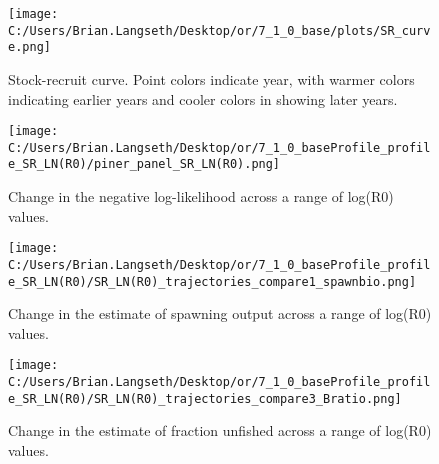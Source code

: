 \documentclass[11pt,
  english,
  a4paper,
]{article}
\begin{document}
\tagmcend\tagstructend


\begin{figure}
\centering
\texttt{[image: C:/Users/Brian.Langseth/Desktop/or/7\_1\_0\_base/plots/SR\_curve.png]}
\caption{Stock-recruit curve. Point colors indicate year, with warmer colors indicating earlier years and cooler colors in showing later years.\label{fig:bh-curve}}
\end{figure}

\tagmcend\tagstructend


\begin{figure}
\centering
\texttt{[image: C:/Users/Brian.Langseth/Desktop/or/7\_1\_0\_baseProfile\_profile\_SR\_LN(R0)/piner\_panel\_SR\_LN(R0).png]}
\caption{Change in the negative log-likelihood across a range of log(R0) values.\label{fig:r0-profile}}
\end{figure}

\tagmcend\tagstructend


\begin{figure}
\centering
\texttt{[image: C:/Users/Brian.Langseth/Desktop/or/7\_1\_0\_baseProfile\_profile\_SR\_LN(R0)/SR\_LN(R0)\_trajectories\_compare1\_spawnbio.png]}
\caption{Change in the estimate of spawning output across a range of log(R0) values.\label{fig:r0-ssb}}
\end{figure}

\tagmcend\tagstructend


\begin{figure}
\centering
\texttt{[image: C:/Users/Brian.Langseth/Desktop/or/7\_1\_0\_baseProfile\_profile\_SR\_LN(R0)/SR\_LN(R0)\_trajectories\_compare3\_Bratio.png]}
\caption{Change in the estimate of fraction unfished across a range of log(R0) values.\label{fig:r0-depl}}
\end{figure}
\end{document}
